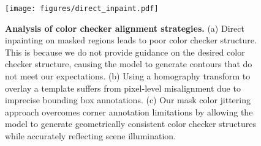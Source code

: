 \begin{figure}[t]
    \centering
    \texttt{[image: figures/direct\_inpaint.pdf]}
    \vspace{-8mm}
    \caption{\textbf{Analysis of color checker alignment strategies.} (a) Direct inpainting on masked regions leads to poor color checker structure. This is because we do not provide guidance on the desired color checker structure, causing the model to generate contours that do not meet our expectations. (b) Using a homography transform to overlay a template suffers from pixel-level misalignment due to imprecise bounding box annotations. (c) Our mask color jittering approach overcomes corner annotation limitations by allowing the model to generate geometrically consistent color checker structures while accurately reflecting scene illumination.}
    \label{fig:direct_inpaint}
\end{figure}